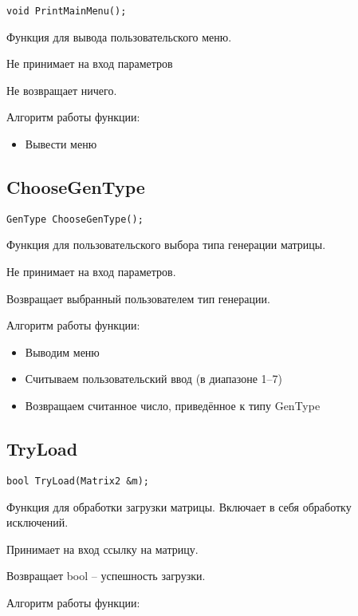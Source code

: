 \begin{lstlisting}[label={lst:PrintMainMenu}]
	void PrintMainMenu();
\end{lstlisting}

Функция для вывода пользовательского меню.

Не принимает на вход параметров

Не возвращает ничего.

Алгоритм работы функции:

\begin{itemize}
	\item Вывести меню
\end{itemize}

\subsection*{ChooseGenType}

\begin{lstlisting}[label={lst:ChooseGenType}]
	GenType ChooseGenType();
\end{lstlisting}

Функция для пользовательского выбора типа генерации матрицы.

Не принимает на вход параметров.

Возвращает выбранный пользователем тип генерации.

Алгоритм работы функции:

\begin{itemize}
	\item Выводим меню
	\item Считываем пользовательский ввод (в диапазоне 1--7)
	\item Возвращаем считанное число, приведённое к типу GenType
\end{itemize}

\subsection*{TryLoad}

\begin{lstlisting}[label={lst:TryLoad}]
	bool TryLoad(Matrix2 &m);
\end{lstlisting}

Функция для обработки загрузки матрицы.
Включает в себя обработку исключений.

Принимает на вход ссылку на матрицу.

Возвращает bool -- успешность загрузки.

Алгоритм работы функции:

